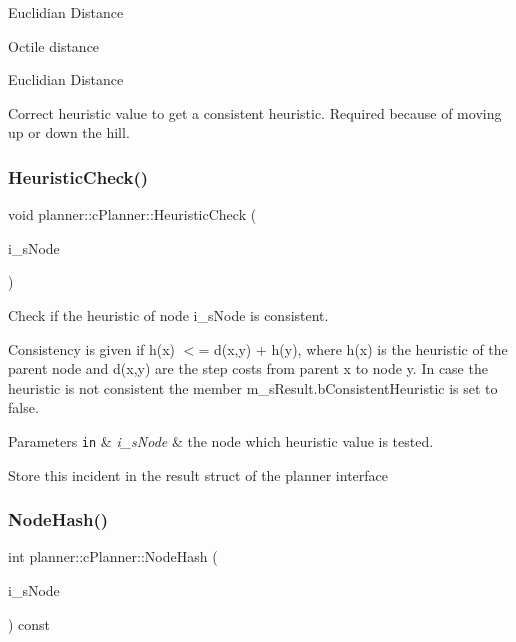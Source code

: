 Euclidian Distance

Octile distance

Euclidian Distance

Correct heuristic value to get a consistent heuristic. Required because of moving up or down the hill. \mbox{\label{classplanner_1_1c_planner_a1234d075676fcaa2c17b859d11b4638c}} 
\subsubsection{\texorpdfstring{Heuristic\+Check()}{HeuristicCheck()}}
{\footnotesize\ttfamily void planner\+::c\+Planner\+::\+Heuristic\+Check (\begin{DoxyParamCaption}\item[{std\+::shared\+\_\+ptr$<$ \mbox{\hyperlink{structplanner_1_1t_node}{t\+Node}} $>$ \&}]{i\+\_\+s\+Node }\end{DoxyParamCaption})}



Check if the heuristic of node i\+\_\+s\+Node is consistent. 

Consistency is given if h(x) $<$= d(x,y) + h(y), where h(x) is the heuristic of the parent node and d(x,y) are the step costs from parent x to node y. In case the heuristic is not consistent the member m\+\_\+s\+Result.\+b\+Consistent\+Heuristic is set to false. 
\begin{DoxyParams}[1]{Parameters}
\mbox{\tt in}  & {\em i\+\_\+s\+Node} & the node which heuristic value is tested. \\
\hline
\end{DoxyParams}
Store this incident in the result struct of the planner interface \mbox{\label{classplanner_1_1c_planner_a4c99873ce64b214899d65eda6366455f}} 
\subsubsection{\texorpdfstring{Node\+Hash()}{NodeHash()}}
{\footnotesize\ttfamily int planner\+::c\+Planner\+::\+Node\+Hash (\begin{DoxyParamCaption}\item[{std\+::shared\+\_\+ptr$<$ \mbox{\hyperlink{structplanner_1_1t_node}{t\+Node}} $>$ \&}]{i\+\_\+s\+Node }\end{DoxyParamCaption}) const}



